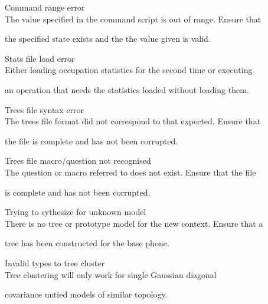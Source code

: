 \begin{itemize}
\begin{itemize}
    Command range error\\


        The value specified in the command script is out of range.  Ensure that


        the specified state exists and the the value given is valid.





 Stats file load error\\


        Either loading occupation statistics for the second time or executing 


        an operation that needs the statistics loaded without loading them.





    Trees file syntax error\\


        The trees file format did not correspond to that expected.  Ensure that


        the file is complete and has not been corrupted.





    Trees file macro/question not recognised\\


        The question or macro referred to does not exist.  Ensure that the file


        is complete and has not been corrupted.





    Trying to sythesize for unknown model\\


        There is no tree or prototype model for the new context.  Ensure that a


        tree has been constructed for the base phone.





 Invalid types to tree cluster\\


        Tree clustering will only work for single Gaussian diagonal


        covariance untied models of similar topology.






\end{itemize}
\end{itemize}
